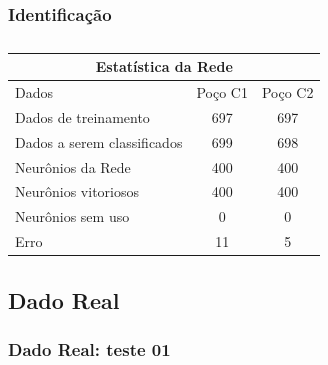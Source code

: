 \documentclass[aspectratio=10]{beamer} %
\begin{document}
\begin{frame}
	\frametitle{Identificação}
\begin{table}[H]
	\centering
	\caption{}
	\label{Estatistica da rede}
	\begin{tabular}{@{}lcc@{}}
		\toprule
		\multicolumn{3}{c}{Estatística da Rede}         \\ \midrule
		Dados                       & Poço C1 & Poço C2 \\
		Dados de treinamento        & 697     & 697     \\
		Dados a serem classificados & 699     & 698     \\
		Neurônios da Rede           & 400     & 400     \\
		Neurônios vitoriosos        & 400     & 400     \\
		Neurônios sem uso           & 0       & 0       \\
		Erro                        & 11      & 5       \\ \bottomrule
	\end{tabular}
\end{table} 
\end{frame}

\subsection{Dado Real}

\begin{frame}
	\frametitle{Dado Real: teste 01}
	\begin{figure}[H]
		\centering
		\qquad
		\qquad
		\qquad
		\label{SOMt01}
	\end{figure}
\end{frame}
\end{document}
